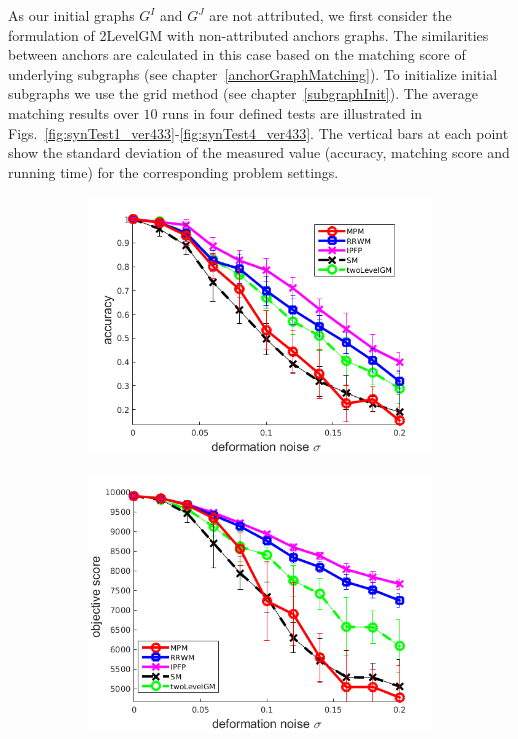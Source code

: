 As our initial graphs $G^I$ and $G^J$ are not attributed, we first consider the formulation of 2LevelGM with non-attributed anchors graphs. The similarities between anchors are calculated in this case based on the matching score of underlying subgraphs (see chapter~\ref{anchorGraphMatching}). To initialize initial subgraphs we use the grid method (see chapter~\ref{subgraphInit}). The average matching results over $10$ runs in four defined tests are illustrated in Figs.~\ref{fig:synTest1_ver433}-\ref{fig:synTest4_ver433}. The vertical bars at each point show the standard deviation of the measured value (accuracy, matching score and running time) for the corresponding problem settings.
\begin{figure}[h] 
	\begin{subfigure}[b]{0.3\textwidth}
		\centering
		\includegraphics[scale=0.25]{"chapter3/fig/SyntheticTest/no_descr/Results_v4.3.3/Test2/accuracy_avg10t"} 
	\end{subfigure}
	\begin{subfigure}[b]{0.3\textwidth}
		\centering
		\includegraphics[scale=0.25]{"chapter3/fig/SyntheticTest/no_descr/Results_v4.3.3/Test2/score_avg10t"} 

\end{subfigure}
\end{figure}
